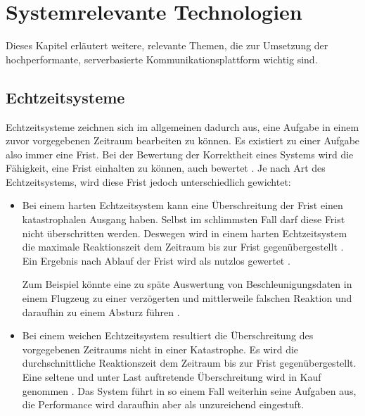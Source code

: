 
\chapter{Systemrelevante Technologien}
\label{com_plattform}

Dieses Kapitel erläutert weitere, relevante Themen, die zur Umsetzung der hochperformante, serverbasierte Kommunikationsplattform wichtig sind.

\section{Echtzeitsysteme}
\label{real_time_systems}
Echtzeitsysteme zeichnen sich im allgemeinen dadurch aus, eine Aufgabe in einem zuvor vorgegebenen Zeitraum bearbeiten zu können.
Es existiert zu einer Aufgabe also immer eine Frist.
Bei der Bewertung der Korrektheit eines Systems wird die Fähigkeit, eine Frist einhalten zu können, auch bewertet \cite[2]{perf:buttazzo2006soft}.
Je nach Art des Echtzeitsystems, wird diese Frist jedoch unterschiedlich gewichtet:

\begin{itemize}
	\item Bei einem harten Echtzeitsystem kann eine Überschreitung der Frist einen katastrophalen Ausgang haben.
	Selbst im schlimmsten Fall darf diese Frist nicht überschritten werden.
	Deswegen wird in einem harten Echtzeitsystem die maximale Reaktionszeit dem Zeitraum bis zur Frist gegenübergestellt \cite[75]{douglass2003real}.
	Ein Ergebnis nach Ablauf der Frist wird als nutzlos gewertet \cite[2]{perf:wang2017real}.
	
	Zum Beispiel könnte eine zu späte Auswertung von Beschleunigungsdaten in einem Flugzeug zu einer verzögerten und mittlerweile falschen Reaktion und daraufhin zu einem Absturz führen \cite[5]{perf:laplante2004real}.
	
	\item Bei einem weichen Echtzeitsystem resultiert die Überschreitung des vorgegebenen Zeitraums nicht in einer Katastrophe.
	Es wird die durchschnittliche Reaktionszeit dem Zeitraum bis zur Frist gegenübergestellt. Eine seltene und unter Last auftretende Überschreitung wird in Kauf genommen \cite[76]{douglass2003real}.
	Das System führt in so einem Fall weiterhin seine Aufgaben aus, die Performance wird daraufhin aber als unzureichend eingestuft.
\end{itemize}

